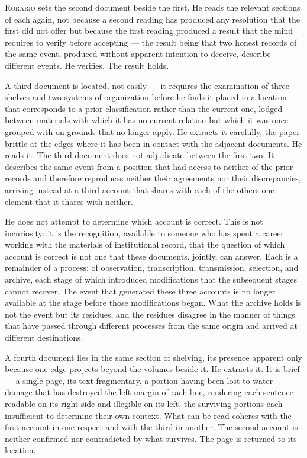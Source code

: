 \documentclass[12pt, oneside]{article}
\newenvironment{action}{%
  \vspace{0.6em}%
  \noindent\ignorespaces%
}{%
  \par\vspace{0.6em}%
}
\begin{document}
\begin{action}
\textsc{Rorario} sets the second document beside the first. He reads the relevant sections of each again, not because a second reading has produced any resolution that the first did not offer but because the first reading produced a result that the mind requires to verify before accepting --- the result being that two honest records of the same event, produced without apparent intention to deceive, describe different events. He verifies. The result holds.

A third document is located, not easily --- it requires the examination of three shelves and two systems of organization before he finds it placed in a location that corresponds to a prior classification rather than the current one, lodged between materials with which it has no current relation but which it was once grouped with on grounds that no longer apply. He extracts it carefully, the paper brittle at the edges where it has been in contact with the adjacent documents. He reads it. The third document does not adjudicate between the first two. It describes the same event from a position that had access to neither of the prior records and therefore reproduces neither their agreements nor their discrepancies, arriving instead at a third account that shares with each of the others one element that it shares with neither.
\end{action}

\begin{action}
He does not attempt to determine which account is correct. This is not incuriosity; it is the recognition, available to someone who has spent a career working with the materials of institutional record, that the question of which account is correct is not one that these documents, jointly, can answer. Each is a remainder of a process: of observation, transcription, transmission, selection, and archive, each stage of which introduced modifications that the subsequent stages cannot recover. The event that generated these three accounts is no longer available at the stage before those modifications began. What the archive holds is not the event but its residues, and the residues disagree in the manner of things that have passed through different processes from the same origin and arrived at different destinations.

A fourth document lies in the same section of shelving, its presence apparent only because one edge projects beyond the volumes beside it. He extracts it. It is brief --- a single page, its text fragmentary, a portion having been lost to water damage that has destroyed the left margin of each line, rendering each sentence readable on its right side and illegible on its left, the surviving portions each insufficient to determine their own context. What can be read coheres with the first account in one respect and with the third in another. The second account is neither confirmed nor contradicted by what survives. The page is returned to its location.
\end{action}
\end{document}

